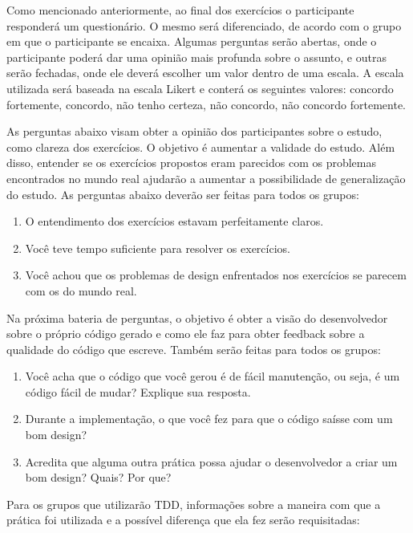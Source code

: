 Como mencionado anteriormente, ao final dos exercícios o participante responderá um questionário. 
O mesmo será diferenciado, de acordo com o grupo em que o participante se encaixa. Algumas
perguntas serão abertas, onde o participante poderá dar uma opinião mais profunda sobre o assunto,
e outras serão fechadas, onde ele deverá escolher um valor dentro de uma escala. A escala utilizada
será baseada na escala Likert e conterá os seguintes valores: concordo fortemente, concordo, não tenho certeza,
não concordo, não concordo fortemente.

As perguntas abaixo visam obter a opinião dos participantes sobre o estudo, como clareza dos
exercícios. O objetivo é aumentar a validade do estudo.
Além disso, entender se os exercícios propostos eram parecidos com os problemas encontrados no mundo
real ajudarão a aumentar a possibilidade de generalização do estudo. As perguntas abaixo deverão
ser feitas para todos os grupos:

\begin{enumerate}
	\item O entendimento dos exercícios estavam perfeitamente claros.
	\item Você teve tempo suficiente para resolver os exercícios.
	\item Você achou que os problemas de design enfrentados nos exercícios se parecem com os do mundo real.
\end{enumerate}

Na próxima bateria de perguntas, o objetivo é obter a visão do desenvolvedor sobre o próprio código gerado e como ele
faz para obter feedback sobre a qualidade do código que escreve. Também serão feitas para todos os grupos:

\begin{enumerate}
	\item Você acha que o código que você gerou é de fácil manutenção, ou seja, é um código fácil de mudar? Explique sua resposta.
	\item Durante a implementação, o que você fez para que o código saísse com um bom design?
	\item Acredita que alguma outra prática possa ajudar o desenvolvedor a criar um bom design? Quais? Por que?
\end{enumerate}

Para os grupos que utilizarão TDD, informações sobre a maneira com que a prática foi utilizada e a possível
diferença que ela fez serão requisitadas:


